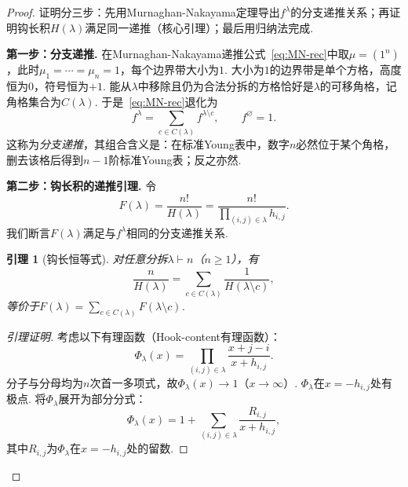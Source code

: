 \documentclass{sjtureport}
\newtheorem{lemma}[theorem]{引理}
\begin{document}
\begin{proof}
证明分三步：先用Murnaghan-Nakayama定理导出$f^\lambda$的分支递推关系；再证明钩长积$H(\lambda)$满足同一递推（核心引理）；最后用归纳法完成. 

\medskip
\noindent\textbf{第一步：分支递推.}\quad
在Murnaghan-Nakayama递推公式~\eqref{eq:MN-rec}中取$\mu=(1^n)$，此时$\mu_1=\cdots=\mu_n=1$，每个边界带大小为$1$. 大小为$1$的边界带是单个方格，高度恒为$0$，符号恒为$+1$. 能从$\lambda$中移除且仍为合法分拆的方格恰好是$\lambda$的可移角格，记角格集合为$C(\lambda)$. 于是~\eqref{eq:MN-rec}退化为
\begin{equation}\label{eq:branching}
    f^\lambda = \sum_{c\in C(\lambda)} f^{\lambda\setminus c},\qquad f^\varnothing = 1.
\end{equation}
这称为\emph{分支递推}，其组合含义是：在标准Young表中，数字$n$必然位于某个角格，删去该格后得到$n-1$阶标准Young表；反之亦然. 

\medskip
\noindent\textbf{第二步：钩长积的递推引理.}\quad
令
\begin{equation*}
    F(\lambda) = \frac{n!}{H(\lambda)} = \frac{n!}{\prod_{(i,j)\in\lambda} h_{i,j}} .
\end{equation*}
我们断言$F(\lambda)$满足与$f^\lambda$相同的分支递推关系. 

\begin{lemma}[钩长恒等式]\label{lem:hook-identity}
    对任意分拆$\lambda\vdash n$（$n\ge 1$），有
    \begin{equation}\label{eq:hook-identity}
        \frac{n}{H(\lambda)} = \sum_{c\in C(\lambda)} \frac{1}{H(\lambda\setminus c)},
    \end{equation}
    等价于$F(\lambda) = \sum_{c\in C(\lambda)} F(\lambda\setminus c)$. 
\end{lemma}

\begin{proof}[引理证明]
    考虑以下有理函数（Hook-content有理函数）：
    \begin{equation}\label{eq:rational}
        \Phi_\lambda(x) = \prod_{(i,j)\in\lambda} \frac{x + j - i}{\,x + h_{i,j}\,}.
    \end{equation}
    分子与分母均为$n$次首一多项式，故$\Phi_\lambda(x)\to 1$（$x\to\infty$）. $\Phi_\lambda$在$x=-h_{i,j}$处有极点. 将$\Phi_\lambda$展开为部分分式：
    \begin{equation*}
        \Phi_\lambda(x) = 1 + \sum_{(i,j)\in\lambda} \frac{R_{i,j}}{x+h_{i,j}},
    \end{equation*}
    其中$R_{i,j}$为$\Phi_\lambda$在$x=-h_{i,j}$处的留数. 


\end{proof}
\end{proof}
\end{document}
